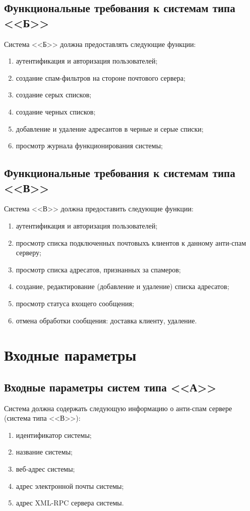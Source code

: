 \subsection{Функциональные требования к системам типа <<Б>>}
Система <<Б>> должна предоставлять следующие функции:
\begin{enumerate}
	\item аутентификация и авторизация пользователей;
	\item создание спам-фильтров на стороне почтового сервера;
	\item создание серых списков;
	\item создание черных списков;
	\item добавление и удаление адресантов в черные и серые списки;
	\item просмотр журнала функционирования системы;
\end{enumerate}


\subsection{Функциональные требования к системам типа <<В>>}
Система <<В>> должна предоставить следующие функции:
\begin{enumerate}
	\item аутентификация и авторизация пользователей;
	\item просмотр списка подключенных почтовыхъ клиентов к данному анти-спам серверу;
	\item просмотр списка адресатов, признанных за спамеров;
	\item создание, редактирование (добавление и удаление) списка адресатов;
	\item просмотр статуса вхощего сообщения;
	\item отмена обработки сообщения: доставка клиенту, удаление.
\end{enumerate}



\section{Входные параметры}
\subsection{Входные параметры систем типа <<А>>}
Система должна содержать следующую информацию о анти-спам сервере (система типа <<В>>):
\begin{enumerate}
	\item идентификатор системы;
	\item название системы;
	\item веб-адрес системы;
	\item адрес электронной почты системы;
	\item адрес XML-RPC сервера системы.
\end{enumerate}


